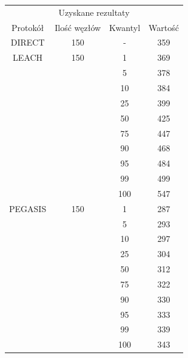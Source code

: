\documentclass[a4paper,12pt,twoside,openany]{report}
\begin{document}
\begin{longtable}{*{4}{c}}
\toprule
\multicolumn{4}{c}{Uzyskane rezultaty} \\
Protokół	& Ilość węzłów	& Kwantyl	& Wartość \\
\midrule
\endhead
DIRECT	& 150 	& -	& 359 \\*
\midrule
LEACH	& 150	& 1	& 369 \\*
	&	& 5	& 378 \\*
	&	& 10	& 384 \\*
	&	& 25	& 399 \\*
	&	& 50	& 425 \\*
	&	& 75	& 447 \\*
	&	& 90	& 468 \\*
	&	& 95	& 484 \\*
	&	& 99	& 499 \\*
	&	& 100	& 547 \\*
\midrule
PEGASIS	& 150	& 1	& 287 \\*
	&	& 5	& 293 \\*
	&	& 10	& 297 \\*
	&	& 25	& 304 \\*
	&	& 50	& 312 \\*
	&	& 75	& 322 \\*
	&	& 90	& 330 \\*
	&	& 95	& 333 \\*
	&	& 99	& 339 \\*
	&	& 100	& 343 \\*
\bottomrule
\end{longtable}
\end{document}
